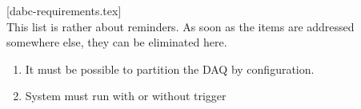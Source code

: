 [dabc-requirements.tex]\\
This list is rather about reminders. As soon as the items are addressed somewhere else,
they can be eliminated here.
\begin{enumerate}
\item It must be possible to partition the DAQ by configuration.
\item System must run with or without trigger
\end{enumerate}
